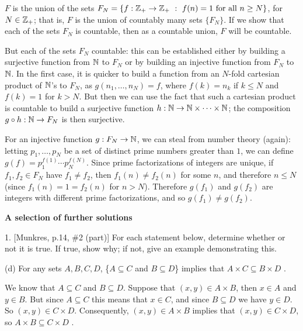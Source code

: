 \ssk

$F$ is the union of the sets $F_N=\{f:{\Bbb Z}_+\rightarrow {\Bbb Z}_+\ :\ f(n)=1\ \text{for}\ \text{all}\ n\geq N\}$,
for $N\in {\Bbb Z}_+$; that is, $F$ is the union of countably many sets $\{F_N\}$. If we show that each of the sets
$F_N$ is countable, then as a countable union, $F$ will be countable.

\ssk

But each of the sets $F_N$  countable: this can be established either by building a surjective
function from ${\Bbb N}$ to $F_N$ or by building an injective function from $F_N$ to ${\Bbb N}$.
In the first case, it is quicker to build a function from an $N$-fold cartesian product of ${\Bbb N}$'s
to $F_N$, as $g(n_1,\ldots,n_N)=f$, where $f(k)=n_k$ if $k\leq N$ and $f(k)=1$ for $k>N$. But then we can use
the fact that such a cartesian product is countable to build a surjective function
$h:{\Bbb N}\rightarrow {\Bbb N}\times\cdots\times {\Bbb N}$; the composition $g\circ h:{\Bbb N}\rightarrow F_N$ is
then surjective.

\ssk

For an injective function $g:F_N\rightarrow {\Bbb N}$, we can steal from number theory (again): letting
$p_1,\ldots,p_N$ be a set of distinct prime numbers greater than $1$, we can define
$g(f)=p_1^{f(1)}\cdots p_N^{f(N)}$. Since prime factorizations of integers are unique,
if $f_1,f_2\in F_N$ have $f_1\neq f_2$, then $f_1(n)\neq f_2(n)$ for some $n$, and therefore
$n\leq N$ (since $f_1(n)=1=f_2(n)$ for $n>N$). Therefore $g(f_1)$ and $g(f_2)$ are integers
with different prime factorizations, and so $g(f_1)\neq g(f_2)$.

\msk

\vfill\eject

{\bf A selection of further solutions}

\msk

\item{1.} [Munkres, p.14, \#2 (part)] For each statement below,
determine whether or not it is true. If true, show why; if 
not, give an example demonstrating this.

\ssk

\item{} (d) For any sets $A,B,C,D$, \{$A\subseteq C$ and $B\subseteq D$\} implies that 
$A\times C \subseteq B\times D$ .

\msk

We know that $A\subseteq C$ and $B\subseteq D$. Suppose that $(x,y)\in A\times B$, 
then $x\in A$ and $y\in B$. But since $A\subseteq C$ this means that $x\in C$, and since
$B\subseteq D$ we have $y\in D$. So $(x,y)\in C\times D$. Consequently, 
$(x,y)\in A\times B$ implies that $(x,y)\in C\times D$, so $A\times B \subseteq C\times D$ .


